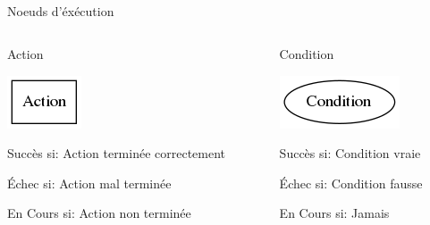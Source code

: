 \documentclass[presentation]{beamer}
\begin{document}
\subsection{}
\label{sec-2-1}

\begin{frame}[label=sec-2-1-1]{Noeuds d'éxécution}
\begin{columns}
\begin{column}{0.5\textwidth}

\begin{center}
\alert{Action}
\end{center}

\includegraphics[width=.9\linewidth]{img/Action.png}


Succès si:
Action terminée correctement

Échec si:
Action mal terminée

En Cours si:
Action non terminée
\end{column}


\begin{column}{0.5\textwidth}

\begin{center}
\alert{Condition}
\end{center}

\includegraphics[width=.9\linewidth]{img/Condition.png}


Succès si:
Condition vraie

Échec si:
Condition fausse

En Cours si:
Jamais
\end{column}
\end{columns}
\end{frame}
\end{document}
